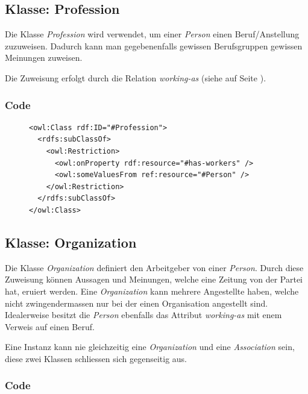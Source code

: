 \documentclass[
    11pt,
    latin1,
    a4paper,
    oneside
]{scrreprt}
\begin{document}
\subsection{Klasse: Profession} \label{sec:class_profession}

Die Klasse \emph{Profession} wird verwendet, um einer \emph{Person} einen Beruf/Anstellung zuzuweisen. Dadurch kann man gegebenenfalls gewissen Berufsgruppen gewissen Meinungen zuweisen.

Die Zuweisung erfolgt durch die Relation \emph{working-as} (siehe  auf Seite \pageref{sec:rel_workingas}).

\subsubsection{Code} \label{sec:class_profession_code}

\begin{figure}[H]
 \lstset{language=XML}
 \begin{lstlisting}[label=owl:profession,caption={Die Klasse \emph{Caption} beschreibt jegliche Berufe}]
<owl:Class rdf:ID="#Profession">
  <rdfs:subClassOf>
    <owl:Restriction>
      <owl:onProperty rdf:resource="#has-workers" />
      <owl:someValuesFrom ref:resource="#Person" />
    </owl:Restriction>
  </rdfs:subClassOf>
</owl:Class>
 \end{lstlisting}
\end{figure}


\subsection{Klasse: Organization} \label{sec:class_organization}

Die Klasse \emph{Organization} definiert den Arbeitgeber von einer \emph{Person}. Durch diese Zuweisung k\"onnen Aussagen und Meinungen, welche eine Zeitung von der Partei hat, eruiert werden. Eine \emph{Organization} kann mehrere Angestellte haben, welche nicht zwingendermassen nur bei der einen Organisation angestellt sind. Idealerweise besitzt die \emph{Person} ebenfalls das Attribut \emph{working-as} mit enem Verweis auf einen Beruf.

Eine Instanz kann nie gleichzeitig eine \emph{Organization} und eine \emph{Association} sein, diese zwei Klassen schliessen sich gegenseitig aus.

\subsubsection{Code} \label{sec:class_organization_code}
\end{document}
